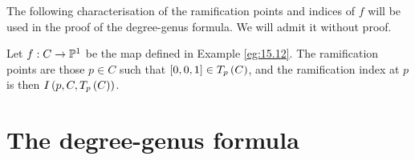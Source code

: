 The following characterisation of the ramification points and indices of $ f $ will be used in the proof of the degree-genus formula. We will admit it without proof.

\begin{proposition}
\label{prop:17.12}
Let $ f : C \to \P^1 $ be the map defined in Example \ref{eg:15.12}. The ramification points are those $ p \in C $ such that $ \sb{0, 0, 1} \in T_p\rb{C} $, and the ramification index at $ p $ is then $ I\rb{p, C, T_p\rb{C}} $.
\end{proposition}

\pagebreak

\section{The degree-genus formula}

